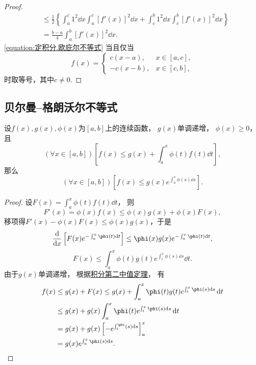 \begin{theorem}[欧庇尔不等式]
\begin{proof}
\begin{align*}
	&\leq \frac{1}{2} \left\{
		\int_a^c{1^2 \dd{x}}
		\int_a^c{[f'(x)]^2 \dd{x}}
		+\int_c^b{1^2 \dd{x}}
		\int_c^b{[f'(x)]^2 \dd{x}}
		\right\} \\
	&= \frac{b-a}{4} \int_a^b{[f'(x)]^2 \dd{x}}.
\end{align*}
\cref{equation:定积分.欧庇尔不等式} 当且仅当\[
	f(x) = \left\{ \begin{array}{cl}
		c(x-a), & x\in\left[a,c\right], \\
		-c(x-b), & x\in\left[c,b\right],
	\end{array} \right.
\]时取等号，其中\(c\neq0\).
\end{proof}
\end{theorem}

\subsection{贝尔曼--格朗沃尔不等式}
\begin{theorem}\label{theorem:定积分.贝尔曼--格朗沃尔不等式}
设\(f(x),g(x),\phi(x)\)为\([a,b]\)上的连续函数，
\(g(x)\)单调递增，
\(\phi(x)\geq0\)，
且\[
	(\forall x \in [a,b])
	\left[
		f(x) \leq g(x) + \int_a^x \phi(t) f(t) \dd{t}
	\right],
\]
那么\[
	(\forall x \in [a,b])
	\left[
		f(x) \leq g(x) e^{\int_a^x \phi(s) \dd{s}}
	\right].
\]
\begin{proof}
设\(F(x) = \int_a^x \phi(t) f(t) \dd{t}\)，
则\[
	F'(x) = \phi(x) f(x) \leq \phi(x) g(x) + \phi(x) F(x),
\]
移项得\(F'(x) - \phi(x) F(x) \leq \phi(x) g(x)\)，于是\[
	\dv{x}\left[F(x) e^{-\int_a^x \phi(t) \dd{t}}\right]
	\leq \phi(x) g(x) e^{-\int_a^x \phi(t) \dd{t}},
\]\[
	F(x) \leq \int_a^x \phi(t) g(t) e^{\int_t^x \phi(s) \dd{s}} \dd{t}.
\]
由于\(g(x)\)单调递增，
根据\hyperref[theorem:定积分.积分中值定理2]{积分第二中值定理}，
有\begin{align*}
	f(x) &\leq g(x) + F(x)
		\leq g(x) + \int_a^x \phi(t) g(t) e^{\int_t^x \phi(s) \dd{s}} \dd{t} \\
	&\leq g(x) + g(x) \int_a^x \phi(t) e^{\int_t^x \phi(s) \dd{s}} \dd{t} \\
	&= g(x) + g(x) \left[-e^{\int_t^ \phi(s) \dd{s}}\right]_a^x \\
	&= g(x) e^{\int_a^x \phi(s) \dd{s}}.
	\qedhere
\end{align*}
\end{proof}
\end{theorem}
